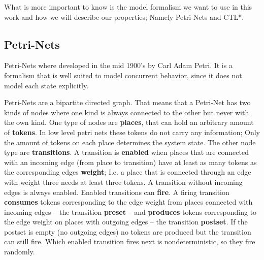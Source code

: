What is more important to know is the model formalism we want to use in this work and how we will describe our properties; Namely Petri-Nets and CTL*.

\subsection{Petri-Nets}
\label{rel_petri}
Petri-Nets where developed in the mid 1900's by Carl Adam Petri\cite{petri1962kommunikation}.
It is a formalism that is well suited to model concurrent behavior, since it does not model each state explicitly.

Petri-Nets are a bipartite directed graph.
That means that a Petri-Net has two kinds of nodes where one kind is always connected to the other but never with the own kind.
One type of nodes are \textbf{places}, that can hold an arbitrary amount of \textbf{tokens}.
In low level petri nets these tokens do not carry any information; 
Only the amount of tokens on each place determines the system state.
The other node type are \textbf{transitions}.
A transition is \textbf{enabled} when places that are connected with an incoming edge (from place to transition) have at least as many tokens as the corresponding edges \textbf{weight};
I.e. a place that is connected through an edge with weight three needs at least three tokens.
A transition without incoming edges is always enabled.
Enabled transitions can \textbf{fire}.
A firing transition \textbf{consumes} tokens corresponding to the edge weight from places connected with incoming edges -- the transition \textbf{preset} -- and \textbf{produces} tokens corresponding to the edge weight on places with outgoing edges -- the transition \textbf{postset}.
If the postset is empty (no outgoing edges) no tokens are produced but the transition can still fire.
Which enabled transition fires next is nondeterministic, so they fire randomly.

